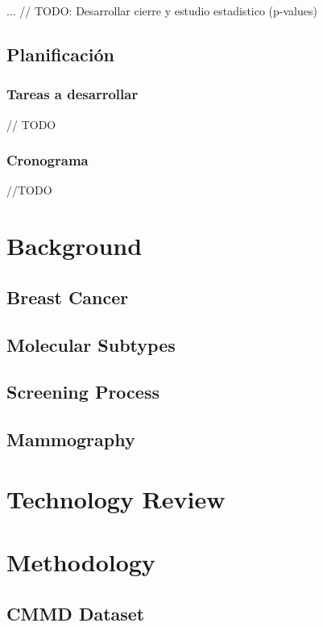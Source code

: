 \documentclass[a4paper,10pt]{book}
\begin{document}
... // TODO: Desarrollar cierre y estudio estadistico (p-values)

\section{Planificación}

\subsection{Tareas a desarrollar}

// TODO

\subsection{Cronograma}

//TODO




\chapter{Background}

\section{Breast Cancer}
\section{Molecular Subtypes}
\section{Screening Process}
\section{Mammography}


\chapter{Technology Review}


\chapter{Methodology}
\section{CMMD Dataset}
\end{document}
